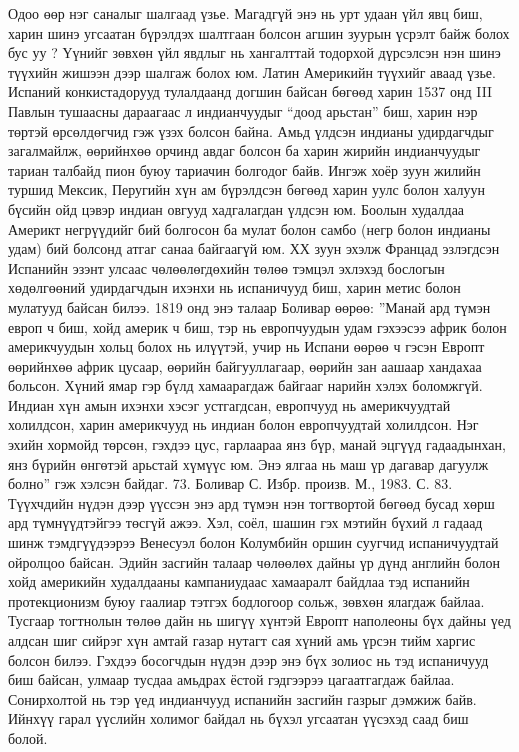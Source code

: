 Одоо өөр нэг саналыг шалгаад үзье. Магадгүй энэ нь урт удаан үйл явц биш, харин шинэ угсаатан бүрэлдэх шалтгаан болсон агшин зуурын үсрэлт байж болох бус уу ? Үүнийг зөвхөн үйл явдлыг нь хангалттай тодорхой дүрсэлсэн нэн шинэ түүхийн жишээн дээр шалгаж болох юм. Латин Америкийн түүхийг аваад үзье. Испаний конкистадорууд тулалдаанд догшин байсан бөгөөд харин 1537 онд III Павлын тушаасны дараагаас л индианчуудыг “доод арьстан” биш, харин нэр төртэй өрсөлдөгчид гэж үзэх болсон байна. Амьд үлдсэн индианы удирдагчдыг загалмайлж, өөрийнхөө орчинд авдаг болсон ба харин жирийн индианчуудыг тариан талбайд пион буюу тариачин болгодог байв. Ингэж хоёр зуун жилийн туршид Мексик, Перугийн хүн ам бүрэлдсэн бөгөөд харин уулс болон халуун бүсийн ойд цэвэр индиан овгууд хадгалагдан үлдсэн юм. Боолын худалдаа Америкт негрүүдийг бий болгосон ба мулат болон самбо (негр болон индианы удам) бий болсонд атгаг санаа байгаагүй юм. ХХ зуун эхэлж Францад эзлэгдсэн Испанийн эзэнт улсаас чөлөөлөгдөхийн төлөө тэмцэл эхлэхэд бослогын хөдөлгөөний удирдагчдын ихэнхи нь испаничууд биш, харин метис болон мулатууд байсан билээ. 1819 онд энэ талаар Боливар өөрөө: ”Манай ард түмэн европ ч биш, хойд америк ч биш, тэр нь европчуудын удам гэхээсээ африк болон америкчуудын хольц болох нь илүүтэй, учир нь Испани өөрөө ч гэсэн Европт өөрийнхөө африк цусаар, өөрийн байгууллагаар, өөрийн зан аашаар хандахаа больсон. Хүний ямар гэр бүлд хамаарагдаж байгааг нарийн хэлэх боломжгүй. Индиан хүн амын ихэнхи хэсэг устгагдсан, европчууд нь америкчуудтай холилдсон, харин америкчууд нь индиан болон европчуудтай холилдсон. Нэг эхийн хормойд төрсөн, гэхдээ цус, гарлаараа янз бүр, манай эцгүүд гадаадынхан, янз бүрийн өнгөтэй арьстай хүмүүс юм. Энэ ялгаа нь маш үр дагавар дагуулж болно” гэж хэлсэн байдаг. 73. Боливар С. Избр. произв. М., 1983. С. 83.
Түүхчдийн нүдэн дээр үүссэн энэ ард түмэн нэн тогтвортой бөгөөд бусад хөрш ард түмнүүдтэйгээ төсгүй ажээ. Хэл, соёл, шашин гэх мэтийн бүхий л гадаад шинж тэмдгүүдээрээ Венесуэл болон Колумбийн оршин суугчид испаничуудтай ойролцоо байсан. Эдийн засгийн талаар чөлөөлөх дайны үр дүнд английн болон хойд америкийн худалдааны кампаниудаас хамааралт байдлаа тэд испанийн протекционизм буюу гаалиар тэтгэх бодлогоор сольж, зөвхөн ялагдаж байлаа. Тусгаар тогтнолын төлөө дайн нь шигүү хүнтэй Европт наполеоны бүх дайны үед алдсан шиг сийрэг хүн амтай газар нутагт сая хүний амь үрсэн тийм харгис болсон билээ. Гэхдээ босогчдын нүдэн дээр энэ бүх золиос нь тэд испаничууд биш байсан, улмаар тусдаа амьдрах ёстой гэдгээрээ цагаатгагдаж байлаа. Сонирхолтой нь тэр үед индианчууд испанийн засгийн газрыг дэмжиж байв. Ийнхүү гарал үүслийн холимог байдал нь бүхэл угсаатан үүсэхэд саад биш болой.
